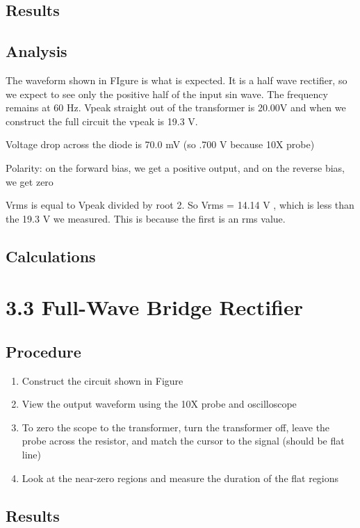 \documentclass[12pt,letterpaper]{report}
\begin{document}
\subsection*{Results}
\subsection*{Analysis}
The waveform shown in FIgure 
 is what is expected. It is a half wave rectifier, so we expect to see only the positive half of the input sin wave. The frequency remains at 60 Hz. Vpeak straight out of the transformer is 20.00V and when we construct the full circuit the vpeak is 19.3 V.
 
 Voltage drop across the diode is 70.0 mV (so .700 V because 10X probe)
 
 Polarity: on the forward bias, we get a positive output, and on the reverse bias, we get zero
 
 Vrms is equal to Vpeak divided by root 2. So Vrms = 14.14 V , which is less than the 19.3 V we measured. This is because the first is an rms value.
\subsection*{Calculations}

\section*{3.3 Full-Wave Bridge Rectifier}
\subsection*{Procedure}

\begin{enumerate}
\item Construct the circuit shown in Figure %
\item View the output waveform using the 10X probe and oscilloscope
\item To zero the scope to the transformer, turn the transformer off, leave the probe across the resistor, and match the cursor to the signal (should be flat line)
\item Look at the near-zero regions and measure the duration of the flat regions
\end{enumerate}

\subsection*{Results}
\end{document}

